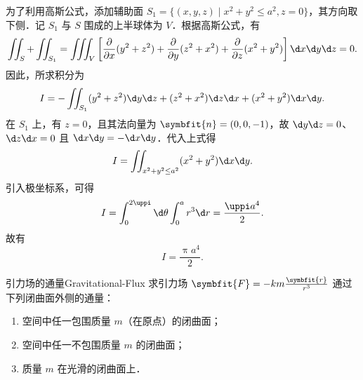 \begin{solution}
    为了利用高斯公式，添加辅助面 $S_1 = \{(x, y, z) \mid x^2 + y^2 \le a^2, z = 0\}$，其方向取下侧．记 $S_1$ 与 $S$ 围成的上半球体为 $V$．根据高斯公式，有
    \begin{equation}
        \label{eq:part6-1}
        \iint_S + \iint_{S_1} = \iiint_V \left[ \frac{\partial}{\partial x}(y^2+z^2) + \frac{\partial}{\partial y}(z^2+x^2) + \frac{\partial}{\partial z}(x^2+y^2) \right] \d x \d y \d z = 0.
    \end{equation}
    因此，所求积分为
    \begin{equation}
        \label{eq:part6-2}
        I = -\iint_{S_1} (y^2+z^2) \d y \d z + (z^2+x^2) \d z \d x + (x^2+y^2) \d x \d y.
    \end{equation}
    在 $S_1$ 上，有 $z = 0$，且其法向量为 $\symbfit{n} = (0, 0, -1)$，故 $\d y \d z = 0$、$\d z \d x = 0$ 且 $\d x \d y = -\d x \d y$．代入上式得
    \begin{equation}
        \label{eq:part6-3}
        I = \iint_{x^2+y^2 \le a^2} (x^2 + y^2) \d x \d y.
    \end{equation}
    引入极坐标系，可得
    \begin{equation}
        \label{eq:part6-4}
        I = \int_0^{2\uppi} \d \theta \int_0^a r^3 \d r = \frac{\uppi a^4}{2}.
    \end{equation}
    故有
    \begin{equation}
        \label{eq:part6-5}
        I = \boxed{\frac{\uppi a^4}{2}}.
    \end{equation}
\end{solution}

\begin{problem}{引力场的通量}{Gravitational-Flux}
    求引力场 $\symbfit{F} = -km\frac{\symbfit{r}}{r^3}$ 通过下列闭曲面外侧的通量：
    \begin{enumerate}
        \item 空间中任一包围质量 $m$（在原点）的闭曲面；
        \item 空间中任一不包围质量 $m$ 的闭曲面；
        \item 质量 $m$ 在光滑的闭曲面上．
    \end{enumerate}
\end{problem}

